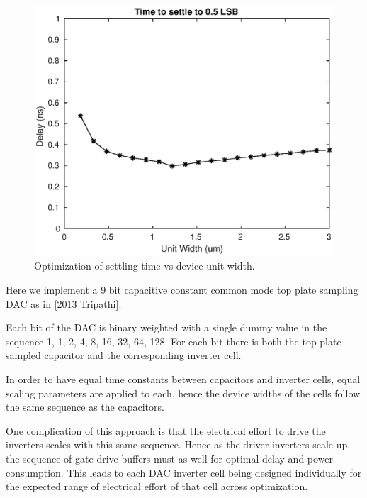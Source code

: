 \documentclass[10pt,journal]{IEEEtran}\usepackage{longtable}
\begin{document}
\begin{figure}[tbph]
\begin{center}
\includegraphics[width=1\columnwidth]{dac_optimization.eps}
\caption{Optimization of settling time vs device unit width.}
\label{fig:DacOptimization}
\end{center}
\end{figure}

Here we implement a 9 bit capacitive constant common mode top plate sampling DAC as in [2013 Tripathi].

Each bit of the DAC is binary weighted with a single dummy value in the
sequence 1, 1, 2, 4, 8, 16, 32, 64, 128.
For each bit there is both the top plate sampled capacitor and the corresponding inverter cell.

In order to have equal time constants between capacitors and inverter cells, equal scaling parameters are applied to each, hence the device widths of the cells follow the same sequence as the capacitors.

One complication of this approach is that the electrical effort to drive the inverters scales with this same sequence. 
Hence as the driver inverters scale up, the sequence of gate drive buffers must as well for optimal delay and power consumption.
This leads to each DAC inverter cell being designed individually for the expected range of electrical effort of that cell across optimization.
\end{document}
